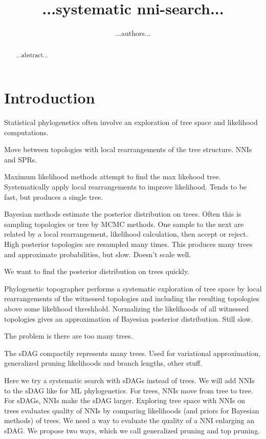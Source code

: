 \documentclass{article}
\title{...systematic nni-search...}
\author{%
...authors...}
\date{%
}
\begin{document}
\allowdisplaybreaks

\maketitle

\clearpage


\begin{abstract}
...abstract...
\end{abstract}




\section{Introduction}

Statistical phylogenetics often involve an exploration of tree space and likelihood computations.

Move between topologies with local rearrangements of the tree structure. 
NNIs and SPRs.

Maximum likelihood methods attempt to find the max likehood tree. 
Systematically apply local rearrangements to improve likelihood. 
Tends to be fast, but produces a single tree.

Bayesian methods estimate the posterior distribution on trees. 
Often this is sampling topologies or tree by MCMC methods. 
One sample to the next are related by a local rearrangement, likelihood calculation, then accept or reject. 
High posterior topologies are resampled many times. 
This produces many trees and approximate probabilities, but slow. 
Doesn't scale well.

We want to find the posterior distribution on trees quickly.

Phylogenetic topographer performs a systematic exploration of tree space by local rearrangements of the witnessed topologies and including the resulting topologies above some likelihood threshhold. 
Normalizing the likelihoods of all witnessed topologies gives an approximation of Bayesian posterior distribution. 
Still slow.

The problem is there are too many trees.

The sDAG compactily represents many trees. 
Used for variational approximation, generalized pruning likelihoods and branch lengths, other stuff.

Here we try a systematic search with sDAGs instead of trees.
We will add NNIs to the sDAG like for ML phylogenetics.
For trees, NNIs move from tree to tree.
For sDAGs, NNIs make the sDAG larger.
Exploring tree space with NNIs on trees evaluates quality of NNIs by comparing likelihoods (and priors for Bayesian methods) of trees.
We need a way to evaluate the quality of a NNI enlarging an sDAG.
We propose two ways, which we call generalized pruning and top pruning.
\end{document}
